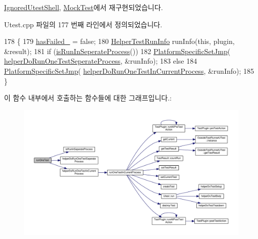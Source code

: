 \hyperlink{class_ignored_utest_shell_ab69c6399c830cda2f3ab1f0e705d3dc9}{Ignored\+Utest\+Shell}, \hyperlink{class_mock_test_a30e2be9df97e0b51380fa8934be2bba4}{Mock\+Test}에서 재구현되었습니다.



Utest.\+cpp 파일의 177 번째 라인에서 정의되었습니다.


\begin{DoxyCode}
178 \{
179     \hyperlink{class_utest_shell_ad1dec6e79c18c95ee078131004eb9ac2}{hasFailed\_} = \textcolor{keyword}{false};
180     \hyperlink{struct_helper_test_run_info}{HelperTestRunInfo} runInfo(\textcolor{keyword}{this}, plugin, &result);
181     \textcolor{keywordflow}{if} (\hyperlink{class_utest_shell_a24f44ff874b460e5e055050af80fb302}{isRunInSeperateProcess}())
182         \hyperlink{_platform_specific_functions__c_8h_a62b2f0c0b77d60a64cded04f9fd503a2}{PlatformSpecificSetJmp}(
      \hyperlink{_utest_8cpp_addbb1b091f7132639496400cb036b473}{helperDoRunOneTestSeperateProcess}, &runInfo);
183     \textcolor{keywordflow}{else}
184         \hyperlink{_platform_specific_functions__c_8h_a62b2f0c0b77d60a64cded04f9fd503a2}{PlatformSpecificSetJmp}(
      \hyperlink{_utest_8cpp_aeaeb69f01f4aaebc0bc8ee631cc9a5de}{helperDoRunOneTestInCurrentProcess}, &runInfo);
185 \}
\end{DoxyCode}


이 함수 내부에서 호출하는 함수들에 대한 그래프입니다.\+:
\nopagebreak
\begin{figure}[H]
\begin{center}
\leavevmode
\includegraphics[width=350pt]{class_utest_shell_a86b5bcccee3889c16117ea5cccee12b5_cgraph}
\end{center}
\end{figure}





